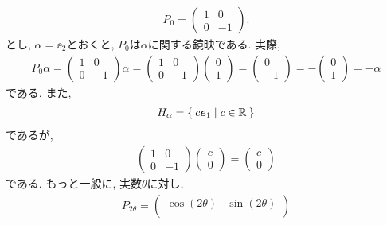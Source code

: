 \begin{example}
  \begin{align*}
    P_0=
    \begin{pmatrix}
      1 & 0 \\
      0 & -1 
    \end{pmatrix}.
  \end{align*}
  とし,
  $\alpha=\ee_2$とおくと,
  $P_0$は$\alpha$に関する鏡映である.
実際, 
\begin{align*}
  P_0\alpha = 
      \begin{pmatrix}
      1 & 0 \\
      0 & -1 
      \end{pmatrix}
      \alpha
    =
      \begin{pmatrix}
      1 & 0 \\
      0 & -1 
    \end{pmatrix}
    \begin{pmatrix}
      0  \\
      1  
    \end{pmatrix}
    =
    \begin{pmatrix}
      0  \\
      -1  
    \end{pmatrix}
    =
    -
    \begin{pmatrix}
      0  \\
      1  
    \end{pmatrix}
    =
    -\alpha
\end{align*}
である.  また,
\begin{align*}
  H_\alpha = \Set{c \boldsymbol{e}_1 | c\in \mathbb{R}}
\end{align*}
であるが,
\begin{align*}
    \begin{pmatrix}
      1 & 0 \\
      0 & -1 
    \end{pmatrix}
    \begin{pmatrix}
      c  \\
      0  
    \end{pmatrix}
    =
    \begin{pmatrix}
      c  \\
      0  
    \end{pmatrix}
\end{align*}
である.
もっと一般に, 実数$\theta$に対し,
\begin{align*}
  P_{2\theta}=
  \begin{pmatrix}
    \cos(2\theta) & \sin(2\theta) \\

\end{pmatrix}
\end{align*}
\end{example}
